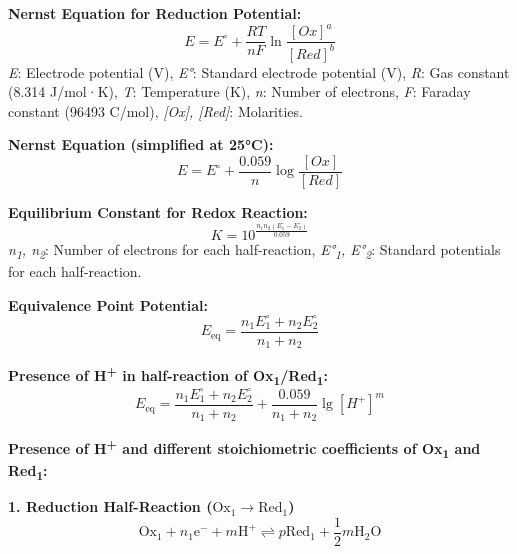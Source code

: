 \textbf{Nernst Equation for Reduction Potential:}
\begin{equation}
E = E^\circ + \frac{RT}{nF} \ln \frac{[Ox]^a}{[Red]^b}
\end{equation}
\textit{E}: Electrode potential (V), \textit{E°}: Standard electrode potential (V), \textit{R}: Gas constant (8.314 J/mol·K), \textit{T}: Temperature (K), \textit{n}: Number of electrons, \textit{F}: Faraday constant (96493 C/mol), \textit{[Ox], [Red]}: Molarities.

\vspace{5mm}

\textbf{Nernst Equation (simplified at 25°C):}
\begin{equation}
E = E^\circ + \frac{0.059}{n} \log \frac{[Ox]}{[Red]}
\end{equation}

\textbf{Equilibrium Constant for Redox Reaction:}
\begin{equation}
K = 10^{\frac{n_1 n_2 (E_1^\circ - E_2^\circ)}{0.059}}
\end{equation}
\textit{n\textsubscript{1}, n\textsubscript{2}}: Number of electrons for each half-reaction, \textit{E°\textsubscript{1}, E°\textsubscript{2}}: Standard potentials for each half-reaction.

\vspace{5mm}

\textbf{Equivalence Point Potential:}
\begin{equation}
E_{\text{eq}} = \frac{n_1 E_1^\circ + n_2 E_2^\circ}{n_1 + n_2}
\end{equation}

\vspace{5mm}

\textbf{Presence of H\textsuperscript{+} in half-reaction of Ox\textsubscript{1}/Red\textsubscript{1}:}
\begin{equation}
E_{\text{eq}} = \frac{n_1 E_1^\circ + n_2 E_2^\circ}{n_1 + n_2} + \frac{0.059}{n_1 + n_2} \lg[H^+]^m
\end{equation}

\vspace{5mm}

\textbf{Presence of H\textsuperscript{+} and different stoichiometric coefficients of Ox\textsubscript{1} and Red\textsubscript{1}:}

\textbf{1. Reduction Half-Reaction ($\text{Ox}_{1} \rightarrow \text{Red}_{1}$)}
\begin{equation}
\text{Ox}_{1} + n_{1}\text{e}^{-} + m\text{H}^{+} \rightleftharpoons p\text{Red}_{1} + \frac{1}{2}m\text{H}_{2}\text{O}
\end{equation}

